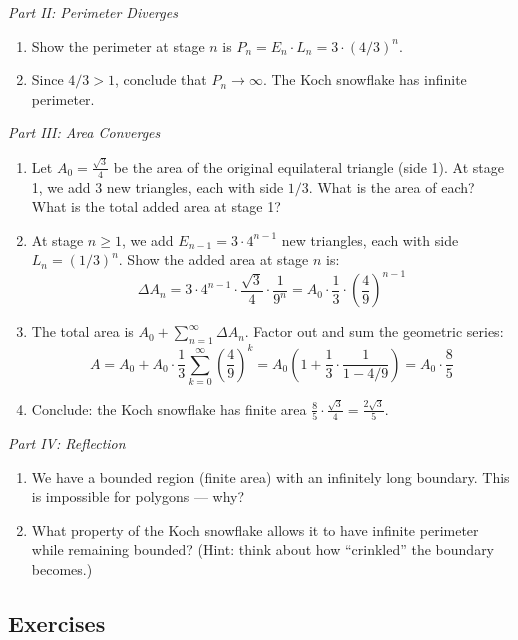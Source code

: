 \documentclass[
  10pt,
  letterpaper,
]{scrbook}
\begin{document}
\emph{Part II: Perimeter Diverges}

\begin{enumerate}
\def\labelenumi{(\alph{enumi})}
\setcounter{enumi}{4}
\item
  Show the perimeter at stage \(n\) is
  \(P_n = E_n \cdot L_n = 3 \cdot (4/3)^n\).
\item
  Since \(4/3 > 1\), conclude that \(P_n \to \infty\). The Koch
  snowflake has infinite perimeter.
\end{enumerate}

\emph{Part III: Area Converges}

\begin{enumerate}
\def\labelenumi{(\alph{enumi})}
\setcounter{enumi}{6}
\item
  Let \(A_0 = \frac{\sqrt{3}}{4}\) be the area of the original
  equilateral triangle (side 1). At stage 1, we add 3 new triangles,
  each with side \(1/3\). What is the area of each? What is the total
  added area at stage 1?
\item
  At stage \(n \geq 1\), we add \(E_{n-1} = 3 \cdot 4^{n-1}\) new
  triangles, each with side \(L_n = (1/3)^n\). Show the added area at
  stage \(n\) is:
  \[\Delta A_n = 3 \cdot 4^{n-1} \cdot \frac{\sqrt{3}}{4} \cdot \frac{1}{9^n} = A_0 \cdot \frac{1}{3} \cdot \left(\frac{4}{9}\right)^{n-1}\]
\item
  The total area is \(A_0 + \sum_{n=1}^{\infty} \Delta A_n\). Factor out
  and sum the geometric series:
  \[A = A_0 + A_0 \cdot \frac{1}{3} \sum_{k=0}^{\infty} \left(\frac{4}{9}\right)^k = A_0 \left(1 + \frac{1}{3} \cdot \frac{1}{1 - 4/9}\right) = A_0 \cdot \frac{8}{5}\]
\item
  Conclude: the Koch snowflake has finite area
  \(\frac{8}{5} \cdot \frac{\sqrt{3}}{4} = \frac{2\sqrt{3}}{5}\).
\end{enumerate}

\emph{Part IV: Reflection}

\begin{enumerate}
\def\labelenumi{(\alph{enumi})}
\setcounter{enumi}{10}
\item
  We have a bounded region (finite area) with an infinitely long
  boundary. This is impossible for polygons --- why?
\item
  What property of the Koch snowflake allows it to have infinite
  perimeter while remaining bounded? (Hint: think about how ``crinkled''
  the boundary becomes.)
\end{enumerate}

\subsection{Exercises}\label{exercises-7}
\end{document}
